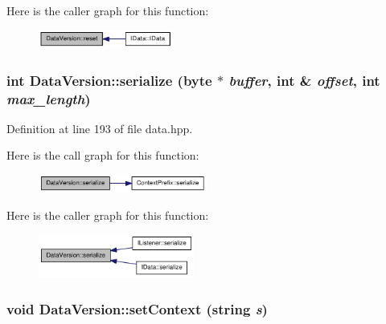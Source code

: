 Here is the caller graph for this function:\nopagebreak
\begin{figure}[H]
\begin{center}
\leavevmode
\includegraphics[width=125pt]{struct_data_version_a78dfae7089aaeffd22198af366968bb3_icgraph}
\end{center}
\end{figure}
\hypertarget{struct_data_version_aad05f62a3e2cd0da4120b970c27f3451}{
\subsubsection[{serialize}]{\setlength{\rightskip}{0pt plus 5cm}int DataVersion::serialize ({\bf byte} $\ast$ {\em buffer}, \/  int \& {\em offset}, \/  int {\em max\_\-length})}}
\label{struct_data_version_aad05f62a3e2cd0da4120b970c27f3451}


Definition at line 193 of file data.hpp.

Here is the call graph for this function:\nopagebreak
\begin{figure}[H]
\begin{center}
\leavevmode
\includegraphics[width=157pt]{struct_data_version_aad05f62a3e2cd0da4120b970c27f3451_cgraph}
\end{center}
\end{figure}


Here is the caller graph for this function:\nopagebreak
\begin{figure}[H]
\begin{center}
\leavevmode
\includegraphics[width=145pt]{struct_data_version_aad05f62a3e2cd0da4120b970c27f3451_icgraph}
\end{center}
\end{figure}
\hypertarget{struct_data_version_a987f2c352ed0c65a7e9d83a1cabebb66}{
\subsubsection[{setContext}]{\setlength{\rightskip}{0pt plus 5cm}void DataVersion::setContext (string {\em s})}}
\label{struct_data_version_a987f2c352ed0c65a7e9d83a1cabebb66}


